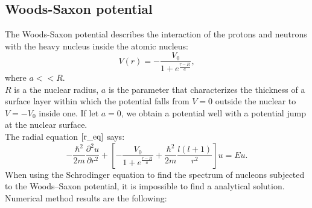 \documentclass[a4paper, 12pt]{article}
\begin{document}
\subsection{Woods-Saxon potential}
The Woods-Saxon potential describes the interaction of the protons and neutrons with the heavy nucleus inside the atomic nucleus:
$$V(r) = -\frac{V_0}{1+e^\frac{r-R}{a}},$$
where $a<<R.$\\ 
$R$ is a the nuclear radius, $a$ is the parameter that characterizes the thickness of a surface layer within which the potential falls from $V=0$ outside the nuclear to  $V = -V_0$ inside one. If let $a=0$, we obtain a potential well with a potential jump at the nuclear surface. \\
The radial equation $\eqref{r_eq}$  says:
$$-\frac{\hbar^2}{2m}\frac{\partial^2 u}{\partial r^2}+[-\frac{V_0}{1+e^\frac{r-R}{a}}+\frac{\hbar^2}{2m}\frac{l(l+1)}{r^2}]u = Eu.$$
When using the Schrodinger equation to find the spectrum of nucleons subjected to the Woods–Saxon potential, it is impossible to find a analytical solution. Numerical method results are the following:
\end{document}
